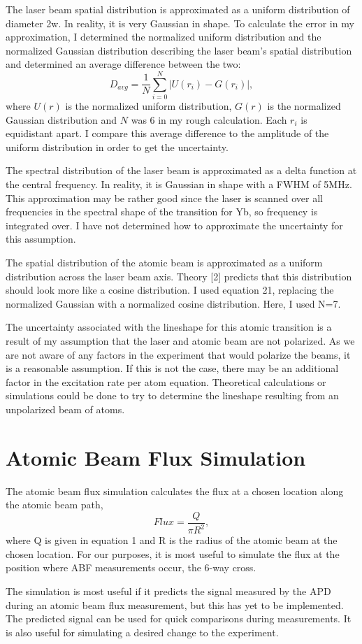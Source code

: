 \documentclass[12pt, a4paper]{article}
\begin{document}
The laser beam spatial distribution is approximated as a uniform distribution of diameter 2w. In reality, it is very Gaussian in shape. To calculate the error in my approximation, I determined the normalized uniform distribution and the normalized Gaussian distribution describing the laser beam's spatial distribution and determined an average difference between the two:
\begin{equation}
D_{avg}=\frac{1}{N}\sum_{i=0}^{N}{|U(r_i)-G(r_i)|},
\end{equation}
where $U(r)$ is the normalized uniform distribution, $G(r)$ is the normalized Gaussian distribution and $N$ was 6 in my rough calculation. Each $r_i$ is equidistant apart. I compare this average difference to the amplitude of the uniform distribution in order to get the uncertainty.

The spectral distribution of the laser beam is approximated as a delta function at the central frequency. In reality, it is Gaussian in shape with a FWHM of 5MHz. This approximation may be rather good since the laser is scanned over all frequencies in the spectral shape of the transition for Yb, so frequency is integrated over. I have not determined how to approximate the uncertainty for this assumption.

The spatial distribution of the atomic beam is approximated as a uniform distribution across the laser beam axis. Theory [2] predicts that this distribution should look more like a cosine distribution. I used equation 21, replacing the normalized Gaussian with a normalized cosine distribution. Here, I used N=7.

The uncertainty associated with the lineshape for this atomic transition is a result of my assumption that the laser and atomic beam are not polarized. As we are not aware of any factors in the experiment that would polarize the beams, it is a reasonable assumption. If this is not the case, there may be an additional factor in the excitation rate per atom equation. Theoretical calculations or simulations could be done to try to determine the lineshape resulting from an unpolarized beam of atoms. 

\section{Atomic Beam Flux Simulation}
The atomic beam flux simulation calculates the flux at a chosen location along the atomic beam path,
\begin{equation}
Flux = \frac{Q}{\pi R^{2}},
\end{equation}
where Q is given in equation 1 and R is the radius of the atomic beam at the chosen location. For our purposes, it is most useful to simulate the flux at the position where ABF measurements occur, the 6-way cross. 

The simulation is most useful if it predicts the signal measured by the APD during an atomic beam flux measurement, but this has yet to be implemented. The predicted signal can be used for quick comparisons during measurements. It is also useful for simulating a desired change to the experiment. 


\nocite{*}
{}

\end{document}
